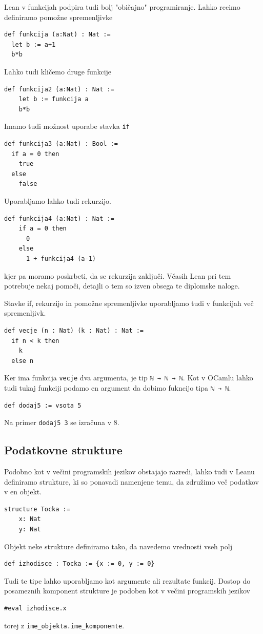 \documentclass[mat1]{fmfdelo}
\begin{document}
Lean v funkcijah podpira tudi bolj "običajno" programiranje. Lahko recimo definiramo pomožne spremenljivke
\begin{lstlisting}
def funkcija (a:Nat) : Nat := 
  let b := a+1
  b*b
\end{lstlisting}

Lahko tudi kličemo druge funkcije
\begin{lstlisting}
def funkcija2 (a:Nat) : Nat :=
    let b := funkcija a
    b*b
\end{lstlisting}

Imamo tudi možnost uporabe stavka \lstinline{if}
\begin{lstlisting}
def funkcija3 (a:Nat) : Bool :=
  if a = 0 then
    true
  else
    false
\end{lstlisting}
Uporabljamo lahko tudi rekurzijo.
\begin{lstlisting}
def funkcija4 (a:Nat) : Nat :=
    if a = 0 then
      0
    else
      1 + funkcija4 (a-1)
\end{lstlisting}
kjer pa moramo poskrbeti, da se rekurzija zaključi. Včasih Lean pri tem potrebuje nekaj pomoči, detajli o tem so izven obsega te diplomske naloge.

Stavke if, rekurzijo in pomožne spremenljivke uporabljamo tudi v funkcijah več spremenljivk.
\begin{lstlisting}
def vecje (n : Nat) (k : Nat) : Nat :=
  if n < k then
    k
  else n
\end{lstlisting}
Ker ima funkcija \lstinline{vecje} dva argumenta, je tip \lstinline{ℕ → ℕ → ℕ}. Kot v OCamlu lahko tudi tukaj funkciji podamo en argument 
da dobimo fukncijo tipa \lstinline{ℕ → ℕ}.
\begin{lstlisting}
def dodaj5 := vsota 5
\end{lstlisting}

Na primer \lstinline{dodaj5 3} se izračuna v 8.


\subsection{Podatkovne strukture}

Podobno kot v večini programskih jezikov obstajajo razredi, lahko tudi v Leanu definiramo strukture, ki so ponavadi namenjene temu,
da združimo več podatkov v en objekt.
\begin{lstlisting}
structure Tocka :=
    x: Nat
    y: Nat
\end{lstlisting}
Objekt neke strukture definiramo tako, da navedemo vrednosti vseh polj
\begin{lstlisting}
def izhodisce : Tocka := {x := 0, y := 0}
\end{lstlisting}
Tudi te tipe lahko uporabljamo kot argumente ali rezultate funkcij.
Dostop do posameznih komponent strukture je podoben kot v večini programskih jezikov
\begin{lstlisting}
#eval izhodisce.x
\end{lstlisting}
torej z \lstinline{ime_objekta.ime_komponente}.
\end{document}
